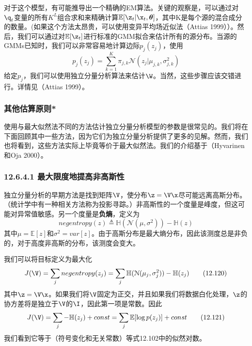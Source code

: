\documentclass[a4paper]{article}
\begin{document}
对于这个模型，有可能推导出一个精确的EM算法。关键的观察是，可以通过对$\q_t$变量的所有$K^L$组合求和来精确计算$\mathbb{E}[\z_t|\x_t,\boldsymbol{\theta}]$，其中K是每个源的混合成分的数量。(如果这个方法太昂贵，可以使用变异平均场近似法（Attias 1999））。然后，我们可以通过对$\mathbb{E}[\z_t]$进行标准的GMM拟合来估计所有的源分布。当源的GMMs已知时，我们可以非常容易地计算边际$p_j(z_j)$，使用
\begin{equation}
	p_j(z_j)=\sum_{k=1}^{K}\pi_{j,k}\mathcal{N}(z_j|\mu_{j,k},\sigma_{j,k}^2)\tag{12.118}
\end{equation}
给定$p_j$，我们可以使用独立分量分析算法来估计$\W$。当然，这些步骤应该交错进行。详情见（Attias 1999）。 
\subsubsection{其他估算原则* }
使用与最大似然法不同的方法估计独立分量分析模型的参数是很常见的。我们将在下面回顾其中一些方法，因为它们为独立分量分析提供了更多的见解。然而，我们也将看到，这些方法实际上毕竟等价于最大似然法。我们的介绍基于（Hyvarinen和Oja 2000）。

\subsubsection*{12.6.4.1  最大限度地提高非高斯性 }
独立分量分析的早期方法是找到矩阵$\V$，使分布$\z=\V \x$尽可能远离高斯分布。（统计学中有一种相关方法称为投影寻踪。）非高斯性的一个度量是峰度，但这可能对异常值敏感。另一个度量是\textbf{负熵}，定义为 
\begin{equation}
	negentropy(z) \triangleq \mathbb{H}(\mathcal{N}(\mu,\sigma^2))-\mathbb{H}(z)\tag{12.119}
\end{equation}
其中$\mu=\mathbb{E}[z]$和$\sigma^2=var[z]$。由于高斯分布是最大熵分布，因此该测度总是非负的，对于高度非高斯的分布，该测度会变大。 

我们可以将目标定义为最大化 
\begin{equation}
	J(\V)=\sum_{j}negentropy(z_j)=\sum_{j}\mathbb{H}(\mathcal{N}(\mu_j,\sigma_j^2))-\mathbb{H}(z_j)\tag{12.120}
\end{equation}
其中$\z=\V\x$。如果我们将$\V$固定为正交，并且如果我们将数据白化处理，$\z$的协方差将是独立于$\V$的$\I$，因此第一项是常数。因此 
\begin{equation}
	J(\V)=\sum_j-\mathbb{H}(z_j)+const=\sum_j\mathbb{E}[\log p(z_j)]+const\tag{12.121}
\end{equation}
我们看到它等于（符号变化和无关常数）等式12.102中的似然对数。
\end{document}

